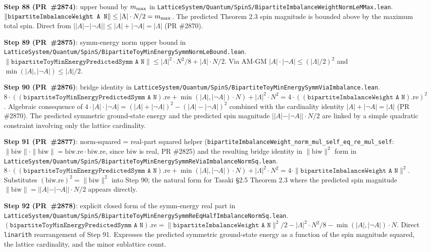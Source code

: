 \documentclass[a4paper,11pt]{article}
\begin{document}
\textbf{Step 88 (PR~\#2874)}: upper bound by $m_{\rm max}$ in
\texttt{LatticeSystem/Quantum/SpinS/BipartiteImbalanceWeightNormLeMMax.lean}.
$\|\texttt{bipartiteImbalanceWeight A N}\| \le |\Lambda| \cdot N / 2
= m_{\rm max}$. The predicted Theorem 2.3 spin magnitude is
bounded above by the maximum total spin. Direct from
$||A| - |\neg A|| \le |A| + |\neg A| = |\Lambda|$ (PR \#2870).

\textbf{Step 89 (PR~\#2875)}: symm-energy norm upper bound in
\texttt{LatticeSystem/Quantum/SpinS/BipartiteToyMinEnergySymmNormLeBound.lean}.
$\|\texttt{bipartiteToyMinEnergyPredictedSymm A N}\| \le
|\Lambda|^2 \cdot N^2 / 8 + |\Lambda| \cdot N / 2$. Via AM-GM
$|A| \cdot |\neg A| \le (|\Lambda|/2)^2$ and $\min(|A|, |\neg A|)
\le |\Lambda|/2$.

\textbf{Step 90 (PR~\#2876)}: bridge identity in
\texttt{LatticeSystem/Quantum/SpinS/BipartiteToyMinEnergySymmViaImbalance.lean}.
$8 \cdot ((\texttt{bipartiteToyMinEnergyPredictedSymm A N}).\mathrm{re}
   + \min(|A|, |\neg A|) \cdot N)
   + |\Lambda|^2 \cdot N^2
   = 4 \cdot ((\texttt{bipartiteImbalanceWeight A N}).\mathrm{re})^2$.
Algebraic consequence of $4 \cdot |A| \cdot |\neg A| =
(|A|+|\neg A|)^2 - (|A|-|\neg A|)^2$ combined with the
cardinality identity $|A| + |\neg A| = |\Lambda|$ (PR \#2870).
The predicted symmetric ground-state energy and the predicted
spin magnitude $||A| - |\neg A|| \cdot N / 2$ are linked by a
simple quadratic constraint involving only the lattice
cardinality.

\textbf{Step 91 (PR~\#2877)}: norm-squared = real-part squared
helper
(\texttt{bipartiteImbalanceWeight\_norm\_mul\_self\_eq\_re\_mul\_self}:
$\|\mathrm{biw}\|\cdot\|\mathrm{biw}\| =
\mathrm{biw}.\mathrm{re}\cdot\mathrm{biw}.\mathrm{re}$, since
$\mathrm{biw}$ is real, PR \#2825) and the resulting bridge
identity in $\|\mathrm{biw}\|^2$ form in
\texttt{LatticeSystem/Quantum/SpinS/BipartiteToyMinEnergySymmReViaImbalanceNormSq.lean}.
$8 \cdot ((\texttt{bipartiteToyMinEnergyPredictedSymm A N}).\mathrm{re}
   + \min(|A|, |\neg A|) \cdot N)
   + |\Lambda|^2 \cdot N^2
   = 4 \cdot \|\texttt{bipartiteImbalanceWeight A N}\|^2$.
Substitutes $(\mathrm{biw}.\mathrm{re})^2 = \|\mathrm{biw}\|^2$
into Step 90; the natural form for Tasaki §2.5 Theorem 2.3 where
the predicted spin magnitude
$\|\mathrm{biw}\| = ||A| - |\neg A||\cdot N/2$ appears directly.

\textbf{Step 92 (PR~\#2878)}: explicit closed form of the
symm-energy real part in
\texttt{LatticeSystem/Quantum/SpinS/BipartiteToyMinEnergySymmReEqHalfImbalanceNormSq.lean}.
$(\texttt{bipartiteToyMinEnergyPredictedSymm A N}).\mathrm{re}
   = \|\texttt{bipartiteImbalanceWeight A N}\|^2 / 2
   - |\Lambda|^2 \cdot N^2 / 8
   - \min(|A|, |\neg A|) \cdot N$.
Direct \texttt{linarith} rearrangement of Step 91. Expresses the
predicted symmetric ground-state energy as a function of the spin
magnitude squared, the lattice cardinality, and the minor
sublattice count.
\end{document}
